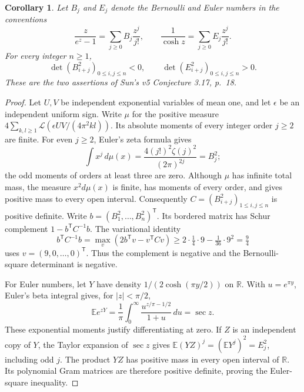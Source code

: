 \documentclass[11pt]{article}
\newtheorem{corollary}[theorem]{Corollary}
\newcommand{\RR}{\mathbb R}
\begin{document}
\begin{corollary}\label{cor:squares}
Let $B_j$ and $E_j$ denote the Bernoulli and Euler numbers in the
conventions
\[
 \frac{z}{e^z-1}=\sum_{j\geq0}B_j\frac{z^j}{j!},\qquad
 \frac1{\cosh z}=\sum_{j\geq0}E_j\frac{z^j}{j!}.
\]
For every integer $n\geq1$,
\[
 \det(B_{i+j}^2)_{0\leq i,j\leq n}<0,
 \qquad \det(E_{i+j}^2)_{0\leq i,j\leq n}>0.
\]
These are the two assertions of Sun's v5 Conjecture 3.17, p.~18.
\end{corollary}
\begin{proof}
Let $U,V$ be independent exponential variables of mean one, and let
$\epsilon$ be an independent uniform sign. Write $\mu$ for the positive
measure $4\sum_{k,l\geq1}\mathcal L(\epsilon UV/(4\pi^2kl))$.
Its absolute moments of every integer order $j\geq2$ are finite.
For even $j\geq2$, Euler's zeta formula\cite[25.6.2]{dlmf} gives
\[
 \int x^j\,d\mu(x)
 =\frac{4(j!)^2\zeta(j)^2}{(2\pi)^{2j}}=B_j^2;
\]
the odd moments of orders at least three are zero. Although $\mu$ has
infinite total mass, the measure $x^2d\mu(x)$ is finite, has moments
of every order, and gives positive mass to every open interval.
Consequently $C=(B_{i+j}^2)_{1\leq i,j\leq n}$ is positive definite.
Write $b=(B_1^2,\ldots,B_n^2)^{\mathsf T}$. Its bordered matrix has
Schur complement $1-b^{\mathsf T}C^{-1}b$. The variational identity
\[
 b^{\mathsf T}C^{-1}b=\max_v(2b^{\mathsf T}v-v^{\mathsf T}Cv)
 \geq 2\cdot\tfrac14\cdot9-\tfrac1{36}\cdot9^2=\tfrac94
\]
uses $v=(9,0,\ldots,0)^{\mathsf T}$. Thus the complement is negative
and the Bernoulli-square determinant is negative.

For Euler numbers, let $Y$ have density $1/(2\cosh(\pi y/2))$ on
$\RR$. With $u=e^{\pi y}$, Euler's beta integral gives, for
$|z|<\pi/2$,
\[
 \mathbb E e^{zY}
 =\frac1\pi\int_0^\infty\frac{u^{z/\pi-1/2}}{1+u}\,du
 =\sec z.
\]
These exponential moments justify differentiating at zero. If $Z$ is
an independent copy of $Y$, the Taylor expansion of $\sec z$
\cite[4.19.5]{dlmf} gives
$\mathbb E(YZ)^j=(\mathbb E Y^j)^2=E_j^2$, including odd $j$.
The product $YZ$ has positive mass in every open interval of $\RR$.
Its polynomial Gram matrices are therefore positive definite, proving
the Euler-square inequality.
\end{proof}
\end{document}
